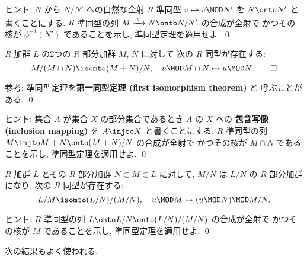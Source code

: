 \documentclass[12pt,twoside]{jarticle}
\begin{document}
\noindent
ヒント: $N$ から $N/N'$ への自然な全射 $R$ 準同型 $v\mapsto v\MOD N'$ 
を $N\onto N'$ と書くことにする.  
$R$ 準同型の列 $M \xrightarrow{\;\phi\;} N \onto N/N'$ の合成が全射で
かつその核が $\phi^{-1}(N')$ であることを示し, 準同型定理を適用せよ.
\qed


\begin{question}[第二同型定理]
\label{q:isom-theorem-2}
  $R$ 加群 $L$ の2つの $R$ 部分加群 $M$, $N$ に対して
  次の $R$ 同型が存在する:
  \begin{equation*}
    M/(M\cap N) \isomto (M+N)/N,
    \quad
    u\MOD M\cap N \mapsto u\MOD N.
    \qed
  \end{equation*}
\end{question}

\noindent
参考: 準同型定理を{\bf 第一同型定理 (first isomorphism theorem)} と
呼ぶことがある. \qed

\medskip
\noindent
ヒント: 集合 $A$ が集合 $X$ の部分集合であるとき $A$ の $X$ への
{\bf 包含写像 (inclusion mapping)} を $A\injto X$ と書くことにする.
$R$ 準同型の列 $M\injto M+N\onto (M+N)/N$ の合成が全射で
かつその核が $M\cap N$ であることを示し, 準同型定理を適用せよ.
\qed


\begin{question}[第三同型定理]
\label{q:isom-theorem-3}
  $R$ 加群 $L$ とその $R$ 部分加群 $N\subset M\subset L$ に対して, 
  $M/N$ は $L/N$ の $R$ 部分加群になり, 次の $R$ 同型が存在する:
  \begin{equation*}
    L/M \isomto (L/N)/(M/N),
    \quad
    u\MOD M \mapsto (u\MOD N)\MOD M/N.
  \end{equation*}
\end{question}

\noindent
ヒント: $R$ 準同型の列 $L\onto L/N\onto (L/N)/(M/N)$ の合成が全射で
かつその核が $M$ であることを示し, 準同型定理を適用せよ.
\qed

\bigskip

次の結果もよく使われる.
\end{document}
